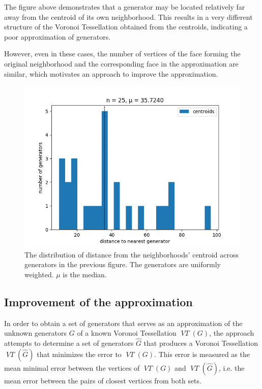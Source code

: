 \documentclass[a4paper]{article}
\DeclareMathOperator*{\VT}{\textit{VT}}
\begin{document}
The figure above demonstrates that a generator may be located relatively far away from the centroid of its
own neighborhood. This results in a very different structure of the Voronoi Tessellation obtained from the centroids,
indicating a poor approximation of generators.

However, even in these cases, the number of vertices
of the face forming the original neighborhood and the corresponding face in the approximation are similar,
which motivates an approach to improve the approximation.
\begin{figure}[H]
	\includegraphics[width=\textwidth]{centroid_distance_histogram.png}
	\caption{The distribution of distance from the neighborhoods' centroid across generators in the previous figure.
		The generators are uniformly weighted. \(\mu\) is the median.}
\end{figure}

\subsection{Improvement of the approximation}
In order to obtain a set of generators that serves as an approximation of the unknown generators \(G\)
of a known Voronoi Tessellation \(\VT(G)\), the approach attempts to determine a set of generators \(\hat{G}\)
that produces a Voronoi Tessellation \(\VT(\hat{G})\) that minimizes the error to \(\VT(G)\). This error is
measured as the mean minimal error between the vertices of \(\VT(G)\) and \(\VT({\hat{G}})\), i.e. the
mean error between the pairs of closest vertices from both sets.
\end{document}

